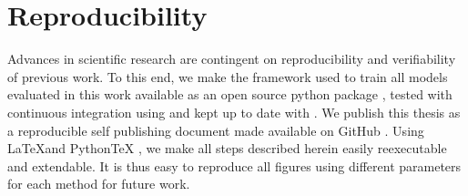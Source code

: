 



\section{Reproducibility}
Advances in scientific research are contingent on reproducibility and verifiability of previous work.
To this end, we make the framework used to train all models evaluated in this work available as an open source python package \citep{mmvae_github}, tested with continuous integration using \citep{travis} and kept up to date with \citep{dependabot}.
We publish this thesis as a reproducible self publishing document \citep[\href{https://github.com/TheChymera/RepSeP}{RepSeP}]{repsep} made available on GitHub \citep{mmnf_repsep}.
Using \LaTeX and PythonTeX \citep{pytex}, we make all steps described herein easily reexecutable and extendable.
It is thus easy to reproduce all figures using different parameters for each method for future work.
